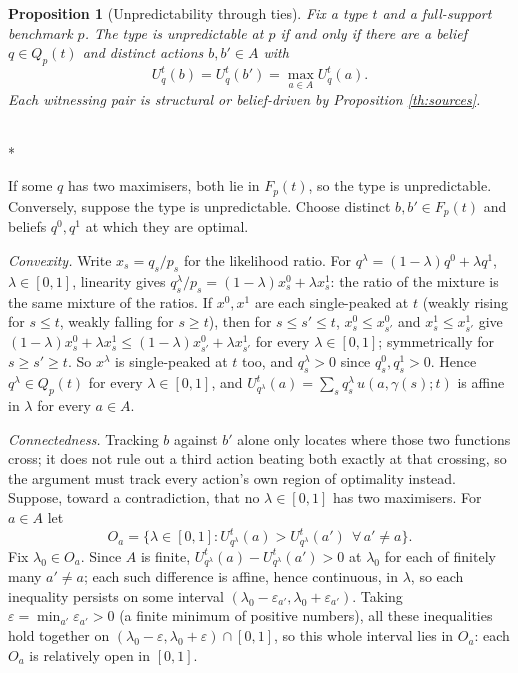 \documentclass[12pt]{article}
\makeatletter
\newtheorem{proposition}{Proposition}
\theoremstyle{definition}
\renewenvironment{proof}[1][\proofname]{\par
  \pushQED{\qed}%
  \normalfont \topsep6\p@\@plus6\p@\relax
  \trivlist
  \item[\hskip\labelsep\itshape #1\@addpunct{.}]\mbox{}\\*
  \ignorespaces
}{%
  \popQED\endtrivlist\@endpefalse
}
\makeatother
\begin{document}
\begin{proposition}[Unpredictability through ties]\label{prop:attainedtie}
Fix a type $t$ and a full-support benchmark $p$. The type is unpredictable at $p$ if and only if there are a belief $q \in Q_p(t)$ and distinct actions $b, b' \in A$ with
\[
U^t_q(b) = U^t_q(b') = \max_{a \in A} U^t_q(a).
\]
Each witnessing pair is structural or belief-driven by Proposition \ref{th:sources}.
\end{proposition}

\begin{proof}[Proof of Proposition \ref{prop:attainedtie}]
If some $q$ has two maximisers, both lie in $F_p(t)$, so the type is unpredictable. Conversely, suppose the type is unpredictable. Choose distinct $b, b' \in F_p(t)$ and beliefs $q^0, q^1$ at which they are optimal.

\emph{Convexity.} Write $x_s = q_s/p_s$ for the likelihood ratio. For $q^\lambda = (1-\lambda) q^0 + \lambda q^1$, $\lambda \in [0,1]$, linearity gives $q^\lambda_s/p_s = (1-\lambda) x^0_s + \lambda x^1_s$: the ratio of the mixture is the same mixture of the ratios. If $x^0, x^1$ are each single-peaked at $t$ (weakly rising for $s \le t$, weakly falling for $s \ge t$), then for $s \le s' \le t$, $x^0_s \le x^0_{s'}$ and $x^1_s \le x^1_{s'}$ give $(1-\lambda) x^0_s + \lambda x^1_s \le (1-\lambda) x^0_{s'} + \lambda x^1_{s'}$ for every $\lambda \in [0,1]$; symmetrically for $s \ge s' \ge t$. So $x^\lambda$ is single-peaked at $t$ too, and $q^\lambda_s > 0$ since $q^0_s, q^1_s > 0$. Hence $q^\lambda \in Q_p(t)$ for every $\lambda \in [0,1]$, and $U^t_{q^\lambda}(a) = \sum_s q^\lambda_s\, u(a, \gamma(s); t)$ is affine in $\lambda$ for every $a \in A$.

\emph{Connectedness.} Tracking $b$ against $b'$ alone only locates where those two functions cross; it does not rule out a third action beating both exactly at that crossing, so the argument must track every action's own region of optimality instead. Suppose, toward a contradiction, that no $\lambda \in [0,1]$ has two maximisers. For $a \in A$ let
\[
O_a = \{\lambda \in [0,1] : U^t_{q^\lambda}(a) > U^t_{q^\lambda}(a') \ \ \forall\, a' \neq a\}.
\]
Fix $\lambda_0 \in O_a$. Since $A$ is finite, $U^t_{q^\lambda}(a) - U^t_{q^\lambda}(a') > 0$ at $\lambda_0$ for each of finitely many $a' \neq a$; each such difference is affine, hence continuous, in $\lambda$, so each inequality persists on some interval $(\lambda_0 - \varepsilon_{a'}, \lambda_0 + \varepsilon_{a'})$. Taking $\varepsilon = \min_{a'} \varepsilon_{a'} > 0$ (a finite minimum of positive numbers), all these inequalities hold together on $(\lambda_0 - \varepsilon, \lambda_0 + \varepsilon) \cap [0,1]$, so this whole interval lies in $O_a$: each $O_a$ is relatively open in $[0,1]$.


\end{proof}
\end{document}
